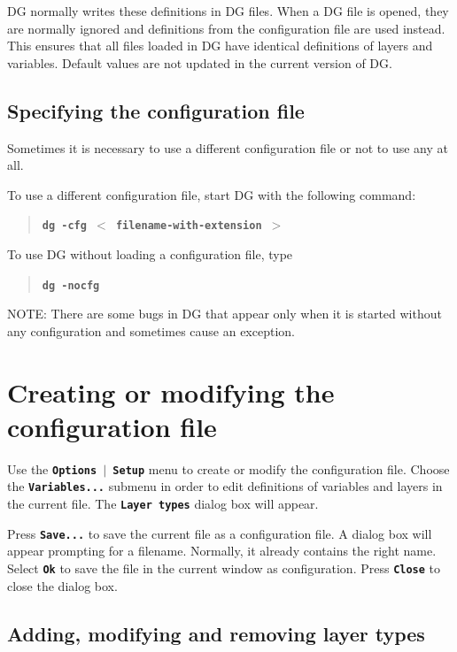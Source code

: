 \documentclass[12pt]{report}
\begin{document}
DG normally writes these definitions in DG files. When a DG file is
opened, they are normally ignored and definitions from the
configuration file are used instead. This ensures that all files loaded
in DG have identical definitions of layers and variables.
Default values are not updated in the current version of DG.

\subsection{Specifying the configuration file}

Sometimes it is necessary to use a different configuration file or not
to use any at all.

To use a different configuration file, start DG with the following
command:
\begin{quote}
\textbf{\texttt{dg -cfg
 \begin{math}<\end{math} filename-with-extension \begin{math}>\end{math} }}
\end{quote}
To use DG without loading a configuration file, type
\begin{quote}
\textbf{\texttt{dg -nocfg}}
\end{quote}
NOTE: There are some bugs in DG that appear only when it is started
without any configuration and sometimes cause an exception.

\section{Creating or modifying the configuration file}

Use the \textbf{\texttt{Options \begin{math}\vert{}\end{math} Setup}}
menu to create or modify the configuration file.
Choose the \textbf{\texttt{Variables...}} submenu
in order to edit definitions of
variables and layers in the current file. The \textbf{\texttt{Layer
types}} dialog box will appear.

Press \textbf{\texttt{Save...}} to save the current file
as a configuration file. A dialog box will appear prompting for a
filename. Normally, it already contains the right name. Select
\textbf{\texttt{Ok}} to save the file in the current window as
configuration.
Press \textbf{\texttt{Close}} to close the dialog box.

\subsection{Adding, modifying and removing layer types}
\end{document}
